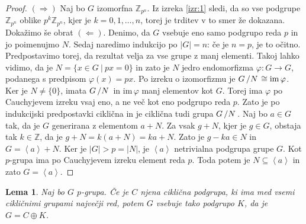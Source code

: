 \documentclass[10pt, a4paper]{article}
\newtheorem{lema}[izr]{Lema}
\newenvironment{noticeC}{%
  \tcolorbox[%
  notitle,
  empty,
  enhanced,  %
  breakable,
  coltext=black, 
  fontupper=\rmfamily,
  noparskip,
  sharp corners,
  boxrule=-1pt,  %
  frame hidden,
  left=7pt,  %
  right=7pt,
  top=5pt,
  bottom=5pt,
  before skip=2.5ex plus 2pt,
  after skip=2.5ex plus 2pt,
  overlay unbroken and last={%
  },
  ]}
{\endtcolorbox}
\newenvironment{dokaz}%
  {\begin{noticeC}\begin{proof}}%
  {\end{proof}\end{noticeC}}
\newcommand{\Z}{\mathbb {Z}}
\newcommand{\quot}[2]{{\raisebox{0em}{$#1$}\left/\raisebox{0em}{$#2$}\right.}}
\newcommand{\gen}[1]{\left\langle #1 \right\rangle}
\newcommand{\im}{\mathrm{im}\,}
\begin{document}
\begin{dokaz}
  $(\Rightarrow)$ Naj bo $G$ izomorfna $\Z_{p^n}$. 
  Iz izreka \ref{izr:1} sledi, da so vse podgrupe $\Z_{p^n}$ oblike
  $p^k \Z_{p^n}$, kjer je $k = 0, 1, \dots, n$, torej je trditev v to smer že dokazana.
  Dokažimo še obrat $(\Leftarrow)$.
  Denimo, da $G$ vsebuje eno samo podgrupo reda $p$ in jo poimenujmo $N$.
  Sedaj naredimo indukcijo po $|G| = n$: če je $n = p$, je to očitno.
  Predpostavimo torej, da rezultat velja za vse grupe z manj elementi.
  Takoj lahko vidimo, da je $N = \{x \in G\ |\ px = 0\}$ in zato je $N$ jedro 
  endomorfizma $\varphi: G \to G$, podanega s predpisom $\varphi(x) = px$.
  Po izreku o izomorfizmu je $\quot{G}{N} \cong \im \varphi$.
  Ker je $N \neq \{0\}$, imata $\quot{G}{N}$ in $\im \varphi$
  manj elementov kot $G$. Torej ima $\varphi$ po Cauchyjevem izreku vsaj eno, 
  a ne več kot eno podgrupo reda $p$. Zato je po indukcijski predpostavki ciklična
  in je ciklična tudi grupa $\quot{G}{N}$.
  Naj bo $a \in G$ tak, da je $G$ generirana z elementom $a + N$.
  Za vsak $g + N$, kjer je $g \in G$, obstaja tak $k \in \Z$,
  da je $g + N = k(a + N) = ka + N$. Zato je $g - ka \in N$ in $G = \gen{a} + N$.
  Ker je $|G| > p = |N|$, je $\gen{a}$ netrivialna podgrupa grupe $G$.
  Kot $p$-grupa ima po Cauchyjevem izreku element reda $p$.
  Toda potem je $N \subseteq \gen{a}$ in zato $G = \gen{a}$.
\end{dokaz}
 
\begin{lema}
  Naj bo $G$ $p$-grupa. Če je $C$ njena ciklična podgrupa, ki ima med vsemi 
  cikličnimi grupami največji red, potem $G$ vsebuje tako podgrupo $K$, da je $G = C \oplus K$.
\end{lema}
\end{document}
